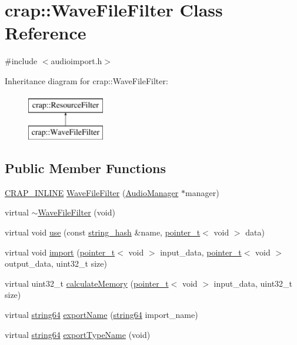 \hypertarget{classcrap_1_1_wave_file_filter}{\section{crap\+:\+:Wave\+File\+Filter Class Reference}
\label{classcrap_1_1_wave_file_filter}
}


{\ttfamily \#include $<$audioimport.\+h$>$}

Inheritance diagram for crap\+:\+:Wave\+File\+Filter\+:\begin{figure}[H]
\begin{center}
\leavevmode
\includegraphics[height=2.000000cm]{classcrap_1_1_wave_file_filter}
\end{center}
\end{figure}
\subsection*{Public Member Functions}
\begin{DoxyCompactItemize}
\item 
\hyperlink{config__x86_8h_a5a40526b8d842e7ff731509998bb0f1c}{C\+R\+A\+P\+\_\+\+I\+N\+L\+I\+N\+E} \hyperlink{classcrap_1_1_wave_file_filter_a6999ba636a9c86cb0b4a971810121379}{Wave\+File\+Filter} (\hyperlink{classcrap_1_1_audio_manager}{Audio\+Manager} $\ast$manager)
\item 
virtual \hyperlink{classcrap_1_1_wave_file_filter_aa0e470afd71f8d2437fb6fff0f5496df}{$\sim$\+Wave\+File\+Filter} (void)
\item 
virtual void \hyperlink{classcrap_1_1_wave_file_filter_a610555d9d31cceddb55efa0a1c5723f9}{use} (const \hyperlink{classcrap_1_1string__hash}{string\+\_\+hash} \&name, \hyperlink{structcrap_1_1pointer__t}{pointer\+\_\+t}$<$ void $>$ data)
\item 
virtual void \hyperlink{classcrap_1_1_wave_file_filter_a4270065dc8e272901b3744eb64d03020}{import} (\hyperlink{structcrap_1_1pointer__t}{pointer\+\_\+t}$<$ void $>$ input\+\_\+data, \hyperlink{structcrap_1_1pointer__t}{pointer\+\_\+t}$<$ void $>$ output\+\_\+data, uint32\+\_\+t size)
\item 
virtual uint32\+\_\+t \hyperlink{classcrap_1_1_wave_file_filter_a5c4b819107aa837000c9671c2da0070f}{calculate\+Memory} (\hyperlink{structcrap_1_1pointer__t}{pointer\+\_\+t}$<$ void $>$ input\+\_\+data, uint32\+\_\+t size)
\item 
virtual \hyperlink{namespacecrap_a2b8a7358804e1a9c3c32f12d8cdcfdf8}{string64} \hyperlink{classcrap_1_1_wave_file_filter_af7f68e71c04b0fe1ca25a5155fefe4ba}{export\+Name} (\hyperlink{namespacecrap_a2b8a7358804e1a9c3c32f12d8cdcfdf8}{string64} import\+\_\+name)
\item 
virtual \hyperlink{namespacecrap_a2b8a7358804e1a9c3c32f12d8cdcfdf8}{string64} \hyperlink{classcrap_1_1_wave_file_filter_a35bb2b0ffeaf82af4b222f47b8d2317c}{export\+Type\+Name} (void)
\end{DoxyCompactItemize}
